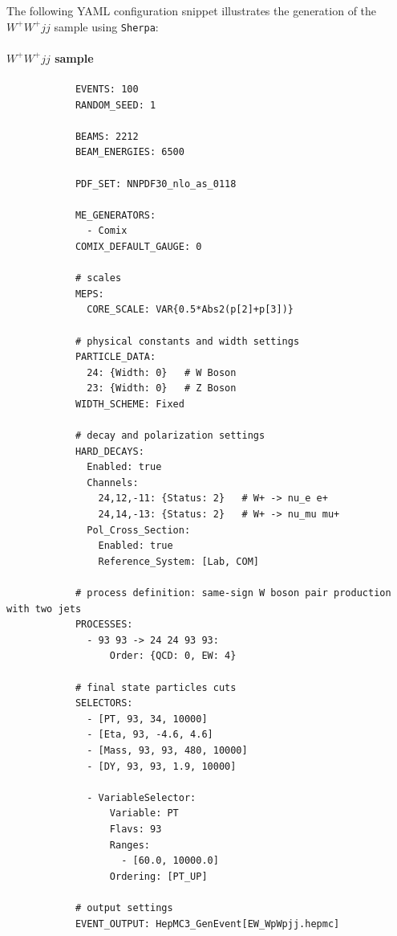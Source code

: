 \documentclass[12pt]{article}
\begin{document}
        The following YAML configuration snippet illustrates the generation of the $W^{+}W^{+}jj$ sample using \verb|Sherpa|:
        \paragraph{$W^{+}W^{+} jj$ sample}
        \begin{lstlisting}
            EVENTS: 100
            RANDOM_SEED: 1

            BEAMS: 2212
            BEAM_ENERGIES: 6500

            PDF_SET: NNPDF30_nlo_as_0118

            ME_GENERATORS:
              - Comix
            COMIX_DEFAULT_GAUGE: 0

            # scales
            MEPS:
              CORE_SCALE: VAR{0.5*Abs2(p[2]+p[3])}

            # physical constants and width settings
            PARTICLE_DATA:
              24: {Width: 0}   # W Boson
              23: {Width: 0}   # Z Boson
            WIDTH_SCHEME: Fixed

            # decay and polarization settings
            HARD_DECAYS:
              Enabled: true
              Channels:
                24,12,-11: {Status: 2}   # W+ -> nu_e e+
                24,14,-13: {Status: 2}   # W+ -> nu_mu mu+
              Pol_Cross_Section:
                Enabled: true
                Reference_System: [Lab, COM]

            # process definition: same-sign W boson pair production with two jets
            PROCESSES:
              - 93 93 -> 24 24 93 93:
                  Order: {QCD: 0, EW: 4}

            # final state particles cuts
            SELECTORS:
              - [PT, 93, 34, 10000]
              - [Eta, 93, -4.6, 4.6]
              - [Mass, 93, 93, 480, 10000]
              - [DY, 93, 93, 1.9, 10000]

              - VariableSelector:
                  Variable: PT
                  Flavs: 93
                  Ranges:
                    - [60.0, 10000.0]
                  Ordering: [PT_UP]

            # output settings
            EVENT_OUTPUT: HepMC3_GenEvent[EW_WpWpjj.hepmc]
        \end{lstlisting}
\end{document}
